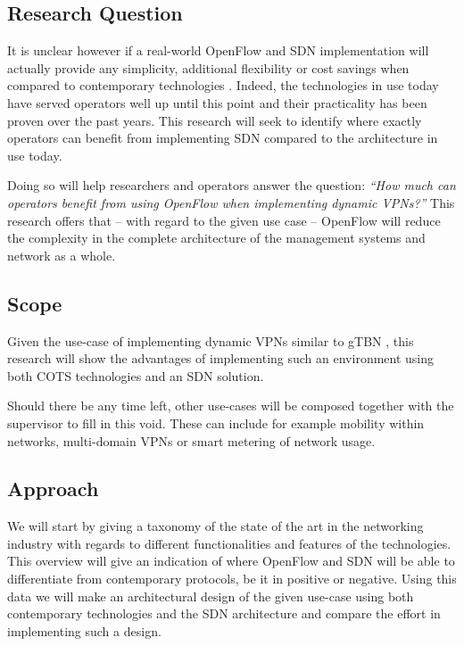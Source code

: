 \documentclass[oneside,twocolumn,8pt,a4paper]{article}
\begin{document}
		\subsection*{Research Question} %
		\label{sub:research_question}
		It is unclear however if a real-world OpenFlow and SDN implementation will actually provide any simplicity, additional flexibility or cost savings when compared to contemporary technologies \cite{programmability-answer}. Indeed, the technologies in use today have served operators well up until this point and their practicality has been proven over the past years. This research will seek to identify where exactly operators can benefit from implementing SDN compared to the architecture in use today.
		
		Doing so will help researchers and operators answer the question: \textsl{``How much can operators benefit from using OpenFlow when implementing dynamic VPNs?''}
		This research offers that -- with regard to the given use case -- OpenFlow will reduce the complexity in the complete architecture of the management systems and network as a whole.

		
		\subsection*{Scope} %
		\label{sub:scope}
		Given the use-case of implementing dynamic VPNs similar to gTBN \cite{gtbn}, this research will show the advantages of implementing such an environment using both COTS technologies and an SDN solution. 
		
		Should there be any time left, other use-cases will be composed together with the supervisor to fill in this void. These can include for example mobility within networks, multi-domain VPNs or smart metering of network usage.
		
		\subsection*{Approach} %
		\label{sub:approach}
		We will start by giving a taxonomy of the state of the art in the networking industry with regards to different functionalities and features of the technologies. This overview will give an indication of where OpenFlow and SDN will be able to differentiate from contemporary protocols, be it in positive or negative. Using this data we will make an architectural design of the given use-case using both contemporary technologies and the SDN architecture and compare the effort in implementing such a design.
		
\end{document}
